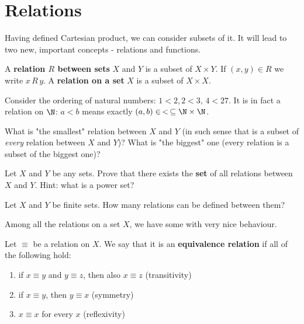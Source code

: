 \section{Relations}
Having defined Cartesian product, we can consider subsets of it. It will lead to two new, important concepts - relations and functions.

\begin{definition}
  A \textbf{relation $R$ between sets} $X$ and $Y$ is a subset of $X\times Y$. If $(x,y)\in R$ we write $x\,R\,y$. A \textbf{relation on a set} $X$ is a subset of $X\times X$.
\end{definition}

\begin{example}
  Consider the ordering of natural numbers: $1<2$,\,$2<3,\, 4<27$. It is in fact a relation on $\N$: $a<b$ means exactly $(a,b)\in\, <\,\subseteq \N\times \N$.
\end{example}

\begin{exercise}
  What is "the smallest" relation between $X$ and $Y$ (in such sense that is a subset of \emph{every} relation between $X$ and $Y$)? What is "the biggest" one (every relation is a subset of the biggest one)?
\end{exercise}

\begin{exercise}
 Let $X$ and $Y$ be any sets. Prove that there exists the \textbf{set} of all relations between $X$ and $Y$. Hint: what is a power set?
\end{exercise}

\begin{exercise}
  Let $X$ and $Y$ be finite sets. How many relations can be defined between them?
\end{exercise}

Among all the relations on a set $X$, we have some with very nice behaviour.

\begin{definition}
  Let $\equiv$ be a relation on $X$. We say that it is an \textbf{equivalence relation} if all of the following hold:
  \begin{enumerate}
    \item if $x\equiv y$ and $y\equiv z$, then also $x\equiv z$ (transitivity)
    \item if $x\equiv y$, then $y\equiv x$ (symmetry)
    \item $x\equiv x$ for every $x$ (reflexivity)
  \end{enumerate}
\end{definition}

